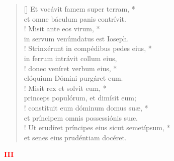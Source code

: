 \begin{verse}[\versewidth]
Et vocávit famem super terram, *\\
et omne báculum panis contrívit.\\!
\vin Misit ante eos virum, *\\
\vin in servum venúmdatus est Ioseph.\\!
Strinxérunt in compédibus pedes eius, *\\
in ferrum intrávit collum eius,\\!
\vin donec veníret verbum eius, *\\
\vin elóquium Dómini purgáret eum.\\!
Misit rex et solvit eum, *\\
princeps populórum, et dimísit eum;\\!
\vin constítuit eum dóminum domus suæ, *\\
\vin et príncipem omnis possessiónis suæ.\\!
Ut erudíret príncipes eius sicut semetípsum, *\\
et senes eius prudéntiam docéret.\\
\end{verse}
\begin{center}
\textcolor{red}{\bf III}
\end{center}
